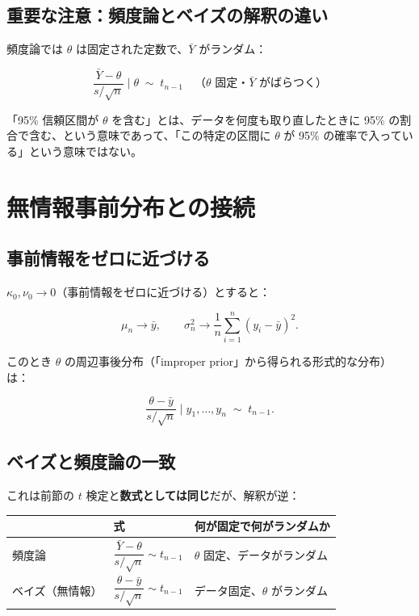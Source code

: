 \documentclass[12pt,a4paper]{ltjsarticle}
\begin{document}
\subsection{重要な注意：頻度論とベイズの解釈の違い}

頻度論では $\theta$ は固定された定数で、$\bar{Y}$ がランダム：

\[
  \frac{\bar{Y} - \theta}{s/\sqrt{n}} \;\Big|\; \theta \;\sim\; t_{n-1}
  \quad \text{（$\theta$ 固定・$\bar{Y}$ がばらつく）}
\]

「95\% 信頼区間が $\theta$ を含む」とは、データを何度も取り直したときに 95\% の割合で含む、という意味であって、「この特定の区間に $\theta$ が 95\% の確率で入っている」という意味ではない。

\section{無情報事前分布との接続}

\subsection{事前情報をゼロに近づける}

$\kappa_0, \nu_0 \to 0$（事前情報をゼロに近づける）とすると：

\[
  \mu_n \to \bar{y}, \qquad
  \sigma_n^2 \to \frac{1}{n}\sum_{i=1}^n (y_i - \bar{y})^2.
\]

このとき $\theta$ の周辺事後分布（「improper prior」から得られる形式的な分布）は：

\[
  \frac{\theta - \bar{y}}{s/\sqrt{n}} \;\Big|\; y_1, \ldots, y_n \;\sim\; t_{n-1}.
\]

\subsection{ベイズと頻度論の一致}

これは前節の $t$ 検定と\textbf{数式としては同じ}だが、解釈が逆：

\begin{center}
\begin{tabular}{lll}
\toprule
 & 式 & 何が固定で何がランダムか \\
\midrule
頻度論 & $\dfrac{\bar{Y} - \theta}{s/\sqrt{n}} \sim t_{n-1}$ & $\theta$ 固定、データがランダム \\[10pt]
ベイズ（無情報） & $\dfrac{\theta - \bar{y}}{s/\sqrt{n}} \sim t_{n-1}$ & データ固定、$\theta$ がランダム \\
\bottomrule
\end{tabular}
\end{center}
\end{document}
